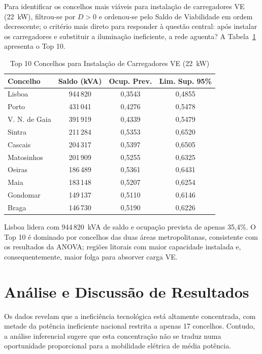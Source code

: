 \documentclass[conference]{IEEEtran}
\begin{document}
Para identificar os concelhos mais viáveis para instalação de carregadores VE (22~kW), filtrou-se por $D > 0$ e ordenou-se pelo Saldo de Viabilidade em ordem decrescente; o critério mais direto para responder à questão central: após instalar os carregadores e substituir a iluminação ineficiente, a rede aguenta? A Tabela~\ref{tab:top10_ve} apresenta o Top 10.

\begin{table}[htbp]
\caption{Top 10 Concelhos para Instalação de Carregadores VE (22~kW)}
\begin{center}
\begin{tabular}{lccc}
\toprule
\textbf{Concelho} & \textbf{Saldo (kVA)} & \textbf{Ocup. Prev.} & \textbf{Lim. Sup. 95\%} \\
\midrule
Lisboa            & 944\,820 & 0,3543 & 0,4855 \\
Porto             & 431\,041 & 0,4276 & 0,5478 \\
V. N. de Gaia     & 391\,919 & 0,4339 & 0,5479 \\
Sintra            & 211\,284 & 0,5353 & 0,6520 \\
Cascais           & 204\,317 & 0,5397 & 0,6505 \\
Matosinhos        & 201\,909 & 0,5255 & 0,6325 \\
Oeiras            & 186\,489 & 0,5361 & 0,6431 \\
Maia              & 183\,148 & 0,5207 & 0,6254 \\
Gondomar          & 149\,137 & 0,5110 & 0,6146 \\
Braga             & 146\,730 & 0,5190 & 0,6226 \\
\bottomrule
\end{tabular}
\label{tab:top10_ve}
\end{center}
\end{table}

Lisboa lidera com 944\,820~kVA de saldo e ocupação prevista de apenas 35,4\%. O Top 10 é dominado por concelhos das duas áreas metropolitanas, consistente com os resultados da ANOVA; regiões litorais com maior capacidade instalada e, consequentemente, maior folga para absorver carga VE.


\section{Análise e Discussão de Resultados}
Os dados revelam que a ineficiência tecnológica está altamente concentrada, com metade da potência ineficiente nacional restrita a apenas 17 concelhos. Contudo, a análise inferencial sugere que esta concentração não se traduz numa oportunidade proporcional para a mobilidade elétrica de média potência.
\end{document}
